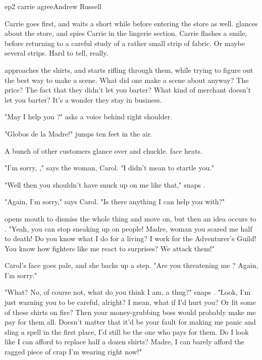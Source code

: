 \documentclass{book}
\begin{document}
\begin{childnode}{ep2 carrie agree}{Andrew Russell}

    Carrie goes first, and \name{} waits a short while before entering the store as well. \name{} glances about the store, and spies Carrie in the lingerie section. Carrie flashes \himher{} a 
    smile, before returning to a careful study of a rather small strip of fabric. Or maybe several strips. Hard to tell, really.

    \name{} approaches the shirts, and starts rifling through them, while trying to figure out the best way to make a scene. What did one make a scene about anyway? The price? The fact that they
    didn't let you barter? What kind of merchant doesn't let you barter? It's a wonder they stay in business. 

    "May I help you \sirmaam{}?" asks a voice behind \names{} right shoulder.

    "Globos de la Madre!" \name{} jumps ten feet in the air. 

    A bunch of other customers glance over and chuckle. \names{} face heats.

    "I'm sorry, \sirmaam{}," says the woman, Carol. "I didn't mean to startle you."

    "Well then you shouldn't have snuck up on me like that," snaps \name{}. 

    "Again, I'm sorry," says Carol. "Is there anything I can help you with?"

    \name{} opens \hisher{} mouth to dismiss the whole thing and move on, but then an idea occurs to \himher{}. "Yeah, you can stop sneaking up on people! Madre, woman you scared me half to 
    death! Do you know what I do for a living? I work for the Adventurer's Guild! You know how fighters like me react to surprises? We attack them!"

    Carol's face goes pale, and she backs up a step. "Are you threatening me \sirmaam{}? Again, I'm sorry."

    "What? No, of course not, what do you think I am, a thug?" snaps \name{}. "Look, I'm just warning you to be careful, alright? I mean, what if I'd hurt you? Or lit some of these shirts on 
    fire? Then your money-grubbing boss would probably make me pay for them all. Doesn't matter that it'd be your fault for making me panic and sling a spell in the first place, I'd still be the
    one who pays for them. Do I look like I can afford to replace half a dozen shirts? Madre, I can barely afford the ragged piece of crap I'm wearing right now!"


\end{childnode}
\end{document}
